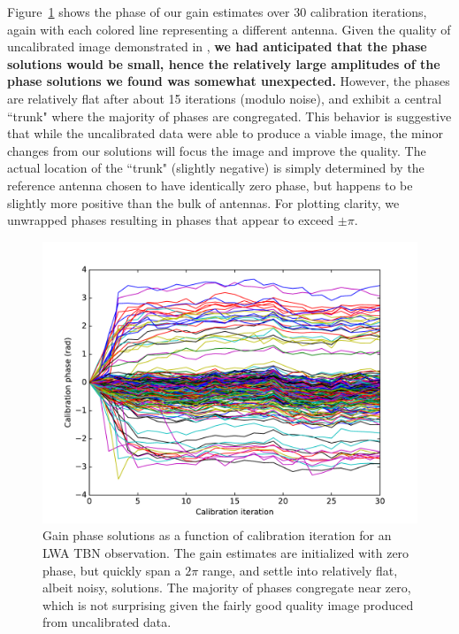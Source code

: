 \documentclass[a4paper,fleqn,usenatbib]{../mnras}
\begin{document}
Figure~\ref{fig:data_phase} shows the phase of our gain estimates over 30 calibration 
iterations, again with each colored line representing a different antenna. Given the quality of 
uncalibrated image demonstrated in \cite{thy15c}, \textbf{we had anticipated that the phase
solutions would be small, hence the relatively large amplitudes of the phase solutions we
found was somewhat unexpected.}
However, the phases are relatively flat after about 15 iterations 
(modulo noise), and exhibit a central ``trunk" where the majority of phases are congregated. 
This behavior is suggestive that while the uncalibrated data were able to produce a viable 
image, the minor changes from our solutions will focus the image and improve the quality. The 
actual location of the ``trunk" (slightly negative) is simply determined by the reference antenna 
chosen to have identically zero phase, but happens to be slightly more positive than the bulk of 
antennas. For plotting clarity, we unwrapped phases resulting in phases that appear to exceed 
$\pm \pi$.

\begin{figure}
\begin{center}
\includegraphics[width=\columnwidth]{fig7.pdf}
\caption{Gain phase solutions as a function of calibration iteration for an LWA TBN observation. 
The gain estimates are initialized with zero phase, but quickly span a $2\pi$ range, and settle 
into relatively flat, albeit noisy, solutions. The majority of phases congregate near zero, which is 
not surprising given the fairly good quality image produced from uncalibrated data.
}
\label{fig:data_phase}
\end{center}
\end{figure}
\end{document}
